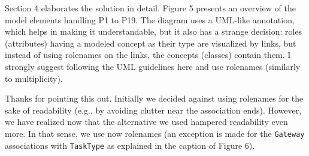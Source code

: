 \documentclass[10pt]{article}
\begin{document}
\begin{response}{Section 4 elaborates the solution in detail. Figure 5 presents an overview of the model elements handling P1 to P19. The diagram uses a UML-like annotation, which helps in making it understandable, but it also has a strange decision: roles (attributes) having a modeled concept as their type are visualized by links, but instead of using rolenames on the links, the concepts (classes) contain them. I strongly suggest following the UML guidelines here and use rolenames (similarly to multiplicity).}

Thanks for pointing this out. Initially we decided against using rolenames for the sake of readability (e.g., by avoiding clutter near the association ends). However, we have realized now that the alternative we used hampered readability even more. In that sense, we use now rolenames (an exception is made for the \texttt{Gateway} associations with \texttt{TaskType} as explained in the caption of Figure 6).

\end{response}

\end{document}

